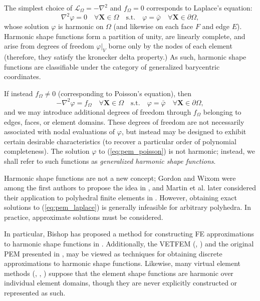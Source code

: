 	The simplest choice of $\mathcal{L}_{\Omega} = -\nabla^2$ and $f_{\Omega} = 0$ corresponds to Laplace's equation:
	\begin{equation}
		\nabla^2 \varphi = 0 \quad \forall \mathbf{X} \in \Omega \quad \text{s.t.} \quad \varphi = \bar{\varphi} \quad \forall \mathbf{X} \in \partial \Omega,
		\label{eq:pem_laplace}
	\end{equation}
	whose solution $\varphi$ is harmonic on $\Omega$ (and likewise on each face $F$ and edge $E$). Harmonic shape functions form a partition of unity, are linearly complete, and arise from degrees of freedom $\varphi|_V$ borne only by the nodes of each element (therefore, they satisfy the kronecker delta property.) As such, harmonic shape functions are classifiable under the category of generalized barycentric coordinates.
	
	If instead $f_{\Omega} \neq 0$ (corresponding to Poisson's equation), then
	\begin{equation}
		-\nabla^2 \varphi = f_{\Omega} \quad \forall \mathbf{X} \in \Omega \quad \text{s.t.} \quad \varphi = \bar{\varphi} \quad \forall \mathbf{X} \in \partial \Omega,
		\label{eq:pem_poisson}
	\end{equation}
	and we may introduce additional degrees of freedom through $f_{\Omega}$ belonging to edges, faces, or element domains. These degrees of freedom are not necessarily associated with nodal evaluations of $\varphi$, but instead may be designed to exhibit certain desirable characteristics (to recover a particular order of polynomial completeness). The solution $\varphi$ to (\ref{eq:pem_poisson}) is not harmonic; instead, we shall refer to such functions as \textit{generalized harmonic shape functions}.
	
	Harmonic shape functions are not a new concept; Gordon and Wixom were among the first authors to propose the idea in \cite{Gordon:74}, and Martin et al. later considered their application to polyhedral finite elements in \cite{Martin:08}. However, obtaining exact solutions to (\ref{eq:pem_laplace}) is generally infeasible for arbitrary polyhedra. In practice, approximate solutions must be considered.
	
	In particular, Bishop has proposed a method for constructing FE approximations to harmonic shape functions in \cite{Bishop:14}. Additionally, the VETFEM (\cite{Rashid:00}, \cite{Rashid:06}) and the original PEM presented in \cite{Rashid:12}, may be viewed as techniques for obtaining discrete approximations to harmonic shape functions. Likewise, many virtual element methods (\cite{Chi:17}, \cite{Veiga:13}, \cite{Veiga:15}) suppose that the element shape functions are harmonic over individual element domains, though they are never explicitly constructed or represented as such.
	
